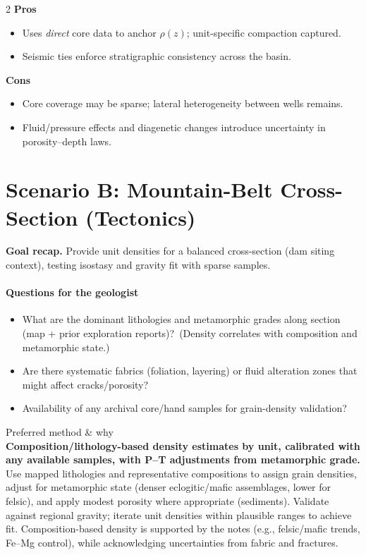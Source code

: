 \documentclass[11pt,a4paper]{article}
\begin{document}
\begin{multicols}{2}
\textbf{Pros}
\begin{itemize}[leftmargin=*]
  \item Uses \emph{direct} core data to anchor $\rho(z)$; unit-specific compaction captured.\label{notesref}
  \item Seismic ties enforce stratigraphic consistency across the basin.
\end{itemize}
\columnbreak
\textbf{Cons}
\begin{itemize}[leftmargin=*]
  \item Core coverage may be sparse; lateral heterogeneity between wells remains.\label{notesref}
  \item Fluid/pressure effects and diagenetic changes introduce uncertainty in porosity--depth laws.
\end{itemize}
\end{multicols}

\section*{Scenario B: Mountain-Belt Cross-Section (Tectonics)}
\textbf{Goal recap.} Provide unit densities for a balanced cross-section (dam siting context), testing isostasy and gravity fit with sparse samples.

\paragraph{Questions for the geologist}
\begin{itemize}[leftmargin=*]
  \item What are the dominant lithologies and metamorphic grades along section (map + prior exploration reports)?~(Density correlates with composition and metamorphic state.)\label{notesref}
  \item Are there systematic fabrics (foliation, layering) or fluid alteration zones that might affect cracks/porosity?\label{notesref}
  \item Availability of any archival core/hand samples for grain-density validation?
\end{itemize}

Preferred method \& why\\
\textbf{Composition/lithology-based density estimates by unit, calibrated with any available samples, with P--T adjustments from metamorphic grade.} Use mapped lithologies and representative compositions to assign grain densities, adjust for metamorphic state (denser eclogitic/mafic assemblages, lower for felsic), and apply modest porosity where appropriate (sediments). Validate against regional gravity; iterate unit densities within plausible ranges to achieve fit. Composition-based density is supported by the notes (e.g., felsic/mafic trends, Fe--Mg control), while acknowledging uncertainties from fabric and fractures.\label{notesref}
\end{document}

